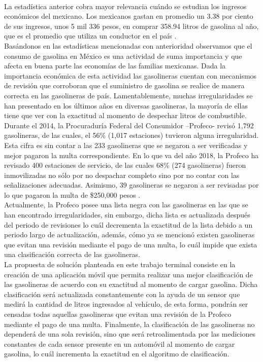 \\
La estadística anterior cobra mayor relevancia cuándo se estudian los ingresos económicos del mexicano. Los mexicanos gastan en promedio un 3.38 por ciento de sus ingresos, unos 5 mil 336 pesos, en comprar 358.94 litros de gasolina al año, que es el promedio que utiliza un conductor en el país \citep{Pre4}.
\\
Basándonos en las estadísticas mencionadas con anterioridad observamos que el consumo de gasolina en México es una actividad de suma importancia y que afecta en buena parte las economías de las familias mexicanas. Dada la importancia económica de esta actividad las gasolineras cuentan con mecanismos de revisión que corroboran que el suministro de gasolina se realice de manera correcta en las gasolineras de país. Lamentablemente, muchas irregularidades se han presentado en los últimos años en diversas gasolineras, la mayoría de ellas tiene que ver con la exactitud al momento de despechar litros de combustible.
\\
Durante el 2014, la Procuraduría Federal del Consumidor –Profeco- revisó 1,792 gasolineras, de las cuales, el 56\% (1,017 estaciones) tuvieron alguna irregularidad. Esta cifra es sin contar a las 233 gasolineras que se negaron a ser verificadas y mejor pagaron la multa correspondiente.
En lo que va del año 2018, la Profeco ha revisado 400 estaciones de servicio, de las cuales 68\% (274 gasolineras) fueron inmovilizadas no sólo por no despachar completo sino por no contar con las señalizaciones adecuadas. Asimismo, 39 gasolineras se negaron a ser revisadas por lo que pagaron la multa de \$250,000 pesos \citep{Pre5}.
\\
Actualmente, la Profeco posee una lista negra con las gasolineras en las que se han encontrado irregularidades, sin embargo, dicha lista es actualizada después del periodo de revisiones lo cuál decrementa la exactitud de la lista debido a un periodo largo de actualización, además, cómo ya se mencionó existen gasolineras que evitan una revisión mediante el pago de una multa, lo cuál impide que exista una clasificación correcta de las gasolineras.
\\
La propuesta de solución planteada en este trabajo terminal consiste en la creación de una aplicación móvil que permita realizar una mejor clasificación de las gasolineras de acuerdo con su exactitud al momento de cargar gasolina. Dicha clasificación será actualizada constantemente con la ayuda de un sensor que medirá la cantidad de litros ingresados al vehículo, de esta forma, pondrán ser censadas todas aquellas gasolineras que evitan una revisión de la Profeco mediante el pago de una multa. Finalmente, la clasificación de las gasolineras no dependerá de una sola revisión, sino que será retroalimentada por las mediciones constantes de cada sensor presente en un automóvil al momento de cargar gasolina, lo cuál incrementa la exactitud en el algoritmo de clasificación.